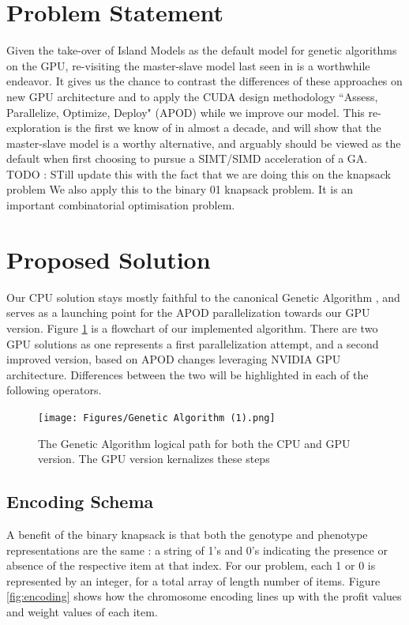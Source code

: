 \documentclass[11pt]{article}       %
\begin{document}
\section{Problem Statement} \label{probstat}
Given the take-over of Island Models as the default model for genetic algorithms on the GPU, re-visiting the master-slave model last seen in \cite{Cavuoti2013-oy} is a worthwhile endeavor. It gives us the chance to contrast the differences of these approaches on new GPU architecture and to apply the CUDA design methodology ``Assess, Parallelize, Optimize, Deploy" (APOD) \cite{bradley_2012} while we improve our model. This re-exploration is the first we know of in almost a decade, and will show that the master-slave model is a worthy alternative, and arguably should be viewed as the default when first choosing to pursue a SIMT/SIMD  acceleration of a GA. 
TODO : STill update this with the fact that we are doing this on the knapsack problem
We also apply this to the binary 01 knapsack problem. It is an important combinatorial optimisation problem.

\section{Proposed Solution} \label{propsol}
Our CPU solution stays mostly faithful to the canonical Genetic Algorithm \cite{holland1984genetic}, and serves as a launching point for the APOD parallelization towards our GPU version. Figure \ref{fig:GA} is a flowchart of our implemented algorithm. There are two GPU solutions as one represents a first parallelization attempt, and a second improved version, based on APOD changes leveraging NVIDIA GPU architecture. Differences between the two will be highlighted in each of the following operators.

\begin{figure}[h]
    \centering
    \texttt{[image: Figures/Genetic Algorithm (1).png]}
    \caption{The Genetic Algorithm logical path for both the CPU and GPU version. The GPU version kernalizes these steps}
    \label{fig:GA}
\end{figure}
\subsection{Encoding Schema}
A benefit of the binary knapsack is that both the genotype and phenotype representations are the same : a string of 1's and 0's indicating the presence or absence of the respective item at that index. For our problem, each 1 or 0 is represented by an integer, for a total array of length number of items. Figure \ref{fig:encoding} shows how the chromosome encoding lines up with the profit values and weight values of each item.
\end{document}
